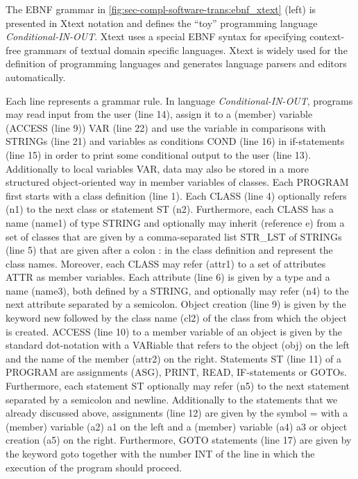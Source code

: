 \begin{example}
\label{ex:sec-compl-software-trans:xtext_ebnf}
The EBNF grammar in \cref{fig:sec-compl-software-trans:ebnf_xtext} (left) is presented in Xtext notation and defines the ``toy'' programming language \textit{Conditional-IN-OUT}.
Xtext \cite{xtext} uses a special EBNF syntax for specifying context-free grammars of textual domain specific languages.
Xtext is widely used for the definition of programming languages and generates language parsers and editors automatically.

Each line represents a grammar rule.
In language \textit{Conditional-IN-OUT}, programs may \textsf{read} input from the user (line 14), assign it to a (member) variable (\textsf{ACCESS} (line 9)) \textsf{VAR} (line 22) and use the variable in comparisons with \textsf{STRING}s (line 21) and variables as conditions \textsf{COND} (line 16) in \textsf{if}-statements (line 15) in order to \textsf{print} some conditional output to the user (line 13).
Additionally to local variables \textsf{VAR}, data may also be stored in a more structured object-oriented way in member variables of classes.
Each \textsf{PROGRAM} \textsf{first} starts with a class definition (line 1).
Each \textsf{CLASS} (line 4) optionally refers (\textsf{n1}) to the next class or statement \textsf{ST} (\textsf{n2}).
Furthermore, each \textsf{CLASS} has a name (\textsf{name1}) of type \textsf{STRING} and optionally may inherit (reference \textsf{e}) from a set of classes that are given by a comma-separated list \textsf{STR\_LST} of \textsf{STRING}s (line 5) that are given after a colon \textsf{:} in the class definition and represent the class names.
Moreover, each \textsf{CLASS} may refer (\textsf{attr1}) to a set of attributes \textsf{ATTR} as member variables.
Each attribute (line 6) is given by a \textsf{type} and a name (\textsf{name3}), both defined by a \textsf{STRING}, and optionally may refer (\textsf{n4}) to the next attribute separated by a semicolon.
Object creation (line 9) is given by the keyword \textsf{new} followed by the class name (\textsf{cl2}) of the class from which the object is created.
\textsf{ACCESS} (line 10) to a member variable of an object is given by the standard dot-notation with a \textsf{VAR}iable that refers to the object (\textsf{obj}) on the left and the name of the member (\textsf{attr2}) on the right.
Statements \textsf{ST} (line 11) of a \textsf{PROGRAM} are assignments (\textsf{ASG}), \textsf{PRINT}, \textsf{READ}, \textsf{IF}-statements or \textsf{GOTO}s.
Furthermore, each statement \textsf{ST} optionally may refer (\textsf{n5}) to the next statement separated by a semicolon and newline.
Additionally to the statements that we already discussed above, assignments (line 12) are given by the symbol \textsf{=} with a (member) variable (\textsf{a2}) \textsf{a1} on the left and a (member) variable (\textsf{a4}) \textsf{a3} or object creation (\textsf{a5}) on the right.
Furthermore, \textsf{GOTO} statements (line 17) are given by the keyword \textsf{goto} together with the number \textsf{INT} of the \textsf{line} in which the execution of the program should proceed.


\end{example}
